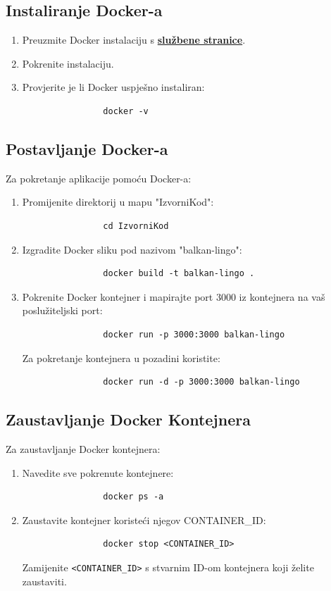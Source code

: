 		\subsection*{Instaliranje Docker-a}
		\begin{enumerate}
			\item Preuzmite Docker instalaciju s \textbf{\href{https://docs.docker.com/get-docker/}{službene stranice}}.
			\item Pokrenite instalaciju.
			\item Provjerite je li Docker uspješno instaliran:
			\begin{verbatim}
				docker -v
			\end{verbatim}
		\end{enumerate}

		\subsection*{Postavljanje Docker-a}
		Za pokretanje aplikacije pomoću Docker-a:
		\begin{enumerate}
			\item Promijenite direktorij u mapu "IzvorniKod":
			\begin{verbatim}
				cd IzvorniKod
			\end{verbatim}
			\item Izgradite Docker sliku pod nazivom "balkan-lingo":
			\begin{verbatim}
				docker build -t balkan-lingo .
			\end{verbatim}
			\item Pokrenite Docker kontejner i mapirajte port 3000 iz kontejnera na vaš poslužiteljski port:
			\begin{verbatim}
				docker run -p 3000:3000 balkan-lingo
			\end{verbatim}
			Za pokretanje kontejnera u pozadini koristite:
			\begin{verbatim}
				docker run -d -p 3000:3000 balkan-lingo
			\end{verbatim}
		\end{enumerate}
		
		\subsection*{Zaustavljanje Docker Kontejnera}
		Za zaustavljanje Docker kontejnera:
		\begin{enumerate}
			\item Navedite sve pokrenute kontejnere:
			\begin{verbatim}
				docker ps -a
			\end{verbatim}
			\item Zaustavite kontejner koristeći njegov CONTAINER\_ID:
			\begin{verbatim}
				docker stop <CONTAINER_ID>
			\end{verbatim}
			Zamijenite \texttt{<CONTAINER\_ID>} s stvarnim ID-om kontejnera koji želite zaustaviti.
		\end{enumerate}


